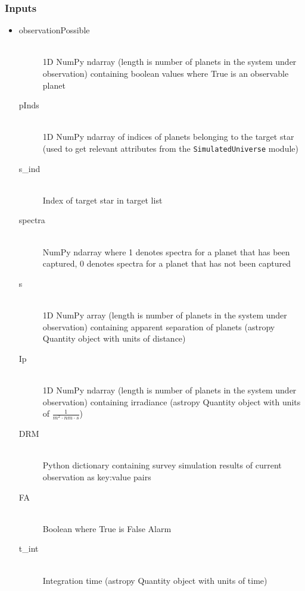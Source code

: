 \documentclass[cleanfoot]{asme2ej}
\begin{document}
\subsubsection*{Inputs}
\begin{itemize}
    \item 
    \begin{description}
        \item[observationPossible] \hfill \\
        1D NumPy ndarray (length is number of planets in the system under observation) containing boolean values where True is an observable planet
        \item[pInds] \hfill \\
        1D NumPy ndarray of indices of planets belonging to the target star (used to get relevant attributes from the \verb+SimulatedUniverse+ module)
        \item[s\_ind] \hfill \\
        Index of target star in target list
        \item[spectra] \hfill \\
        NumPy ndarray where 1 denotes spectra for a planet that has been captured, 0 denotes spectra for a planet that has not been captured
        \item[s] \hfill \\
        1D NumPy array (length is number of planets in the system under observation) containing apparent separation of planets (astropy Quantity object with units of distance)
        \item[Ip] \hfill \\
        1D NumPy ndarray (length is number of planets in the system under observation) containing irradiance (astropy Quantity object with units of $ \frac{1}{m^2 \cdot nm \cdot s} $)
        \item[DRM] \hfill \\
        Python dictionary containing survey simulation results of current observation as key:value pairs
        \item[FA] \hfill \\
        Boolean where True is False Alarm
        \item[t\_int] \hfill \\
        Integration time (astropy Quantity object with units of time)
    \end{description}
\end{itemize}
\end{document}
